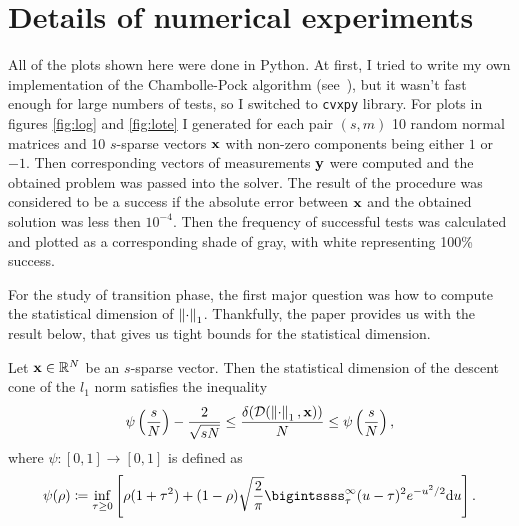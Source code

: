 \section{Details of numerical experiments}

All of the plots shown here were done in Python.
At first, I tried to write my own implementation of the Chambolle-Pock algorithm (see~\cite{chambolle}),
but it wasn't fast enough for large numbers of tests, so I switched to \texttt{cvxpy} library.
For plots in figures \ref{fig:log} and \ref{fig:lote} I generated for each pair $(s, m)$ 10 random normal matrices and
10 $s$-sparse vectors $\mathbf{x}$ with non-zero components being either $1$ or $-1$.
Then corresponding vectors of measurements $\mathbf{y}$ were computed and the obtained problem was passed into the solver.
The result of the procedure was considered to be a success if the absolute error between $\mathbf{x}$ and the obtained solution
was less then $10^{-4}$.
Then the frequency of successful tests was calculated and plotted as a corresponding shade of gray, with white representing 100\%
success.

For the study of transition phase, the first major question was how to compute the statistical dimension of $\left\Vert\cdot\right\Vert_1$.
Thankfully, the paper \cite{lote} provides us with the result below, that gives us tight bounds for the statistical dimension.

\begin{proposition}
    Let $\mathbf{x} \in \mathbb{R}^N$ be an $s$-sparse vector.
    Then the statistical dimension of the descent cone of the $l_1$ norm satisfies the inequality
    \begin{equation}
        \psi\left( \frac{s}{N} \right) - \frac{2}{\sqrt{sN}} \leq \frac{\delta(\mathcal{D}(\left\Vert\cdot\right\Vert_1, \mathbf{x}))}{N}
        \leq \psi\left( \frac{s}{N} \right),
    \end{equation}
    where $\psi:[0,1] \rightarrow [0, 1]$ is defined as
    \begin{equation} \label{eq:inf}
        \psi(\rho) \coloneq \inf_{\tau \geq 0} \left[ \rho (1+\tau^2) +
        (1-\rho) \sqrt{\frac{2}{\pi}} \bigintssss_\tau^\infty  (u-\tau)^2  e^{-u^2/2}\mathrm{d}u \right].
    \end{equation}
\end{proposition}

